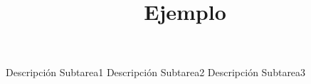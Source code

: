 \documentclass{oci}
\title{Ejemplo}
\begin{document}
\begin{problemDescription}
\lipsum[1-3]
\end{problemDescription}

\begin{inputDescription}
\lipsum[1]
\end{inputDescription}

\begin{outputDescription}
\lipsum[1]
\end{outputDescription}

\begin{scoreDescription}
  Descripción Subtarea1
  Descripción Subtarea2
  Descripción Subtarea3
\end{scoreDescription}

\begin{sampleDescription}
\end{sampleDescription}
\end{document}
